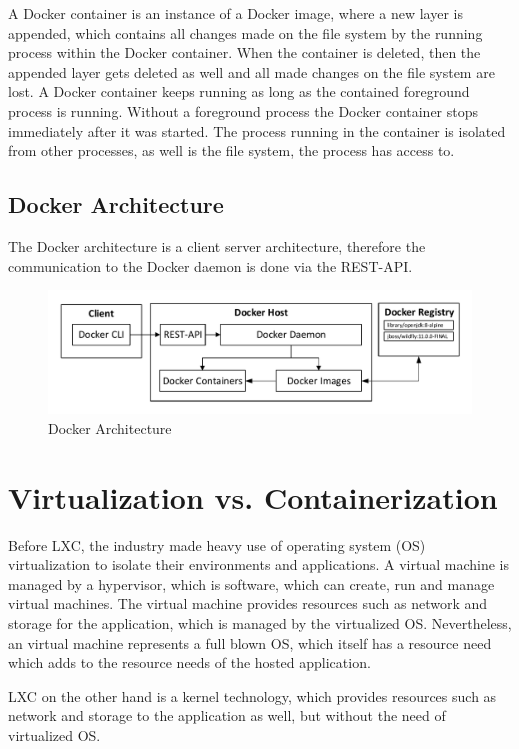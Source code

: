 \label{sec:docker-containers}
A Docker container is an instance of a Docker image, where a new layer is appended, which contains all changes made on the file system by the running process within the Docker container. When the container is deleted, then the appended layer gets deleted as well and all made changes on the file system are lost. A Docker container keeps running as long as the contained foreground process is running. Without a foreground process the Docker container stops immediately after it was started. The process running in the container is isolated from other processes, as well is the file system, the process has access to.

\subsection{Docker Architecture}
\label{sec:docker-architecture}
The Docker architecture is a client server architecture, therefore the communication to the Docker daemon is done via the REST-API. 

\begin{figure}[htbp]
	\centering
	\includegraphics[scale=0.7]{images/docker-architecture.pdf}
	\caption{Docker Architecture}
	\label{fig:docker-enginarchitecture}
\end{figure} 

\section{Virtualization vs. Containerization}
\label{sec:docker-virtualization-vs-containerization}
Before LXC, the industry made heavy use of operating system (OS) virtualization to isolate their environments and applications. A virtual machine is managed by a hypervisor, which is software, which can create, run and manage virtual machines. The virtual machine provides resources such as network and storage for the application, which is managed by the virtualized OS. Nevertheless, an virtual machine represents a full blown OS, which itself has a resource need which adds to the resource needs of the hosted application.

LXC on the other hand is a kernel technology, which provides resources such as network and storage to the application as well, but without the need of virtualized OS. 